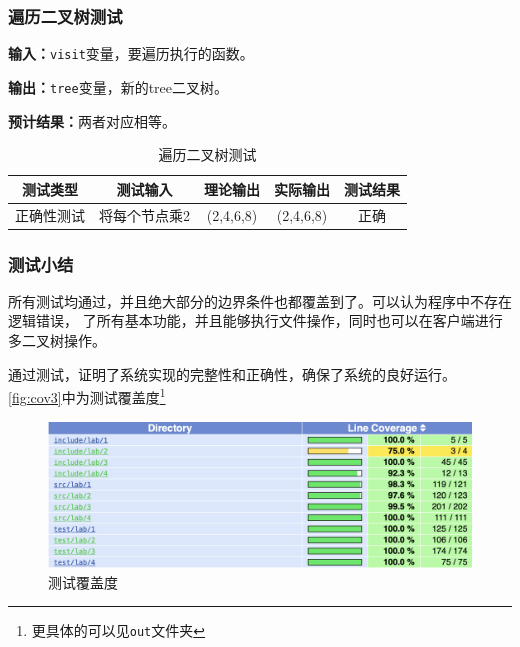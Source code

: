 \subsubsection{遍历二叉树测试}
\textbf{输入：}\texttt{visit}变量，要遍历执行的函数。
\par
\textbf{输出：}\texttt{tree}变量，新的tree二叉树。
\par
\textbf{预计结果：}两者对应相等。
\begin{table}[Htb]
    \caption{遍历二叉树测试}
    \centering
    \begin{tabular}{@{}ccccc@{}}
        \toprule
        \multicolumn{1}{c}{测试类型}    & \multicolumn{1}{c}{测试输入} & \multicolumn{1}{c}{理论输出} & \multicolumn{1}{c}{实际输出} &
        \multicolumn{1}{c}{测试结果} \\ \midrule
        \multicolumn{1}{c|}{正确性测试}  & 将每个节点乘2&(2,4,6,8)&(2,4,6,8)&正确\\ \bottomrule
    \end{tabular}
    \label{tab:traversetest3}
\end{table}

\subsubsection{测试小结}
所有测试均通过，并且绝大部分的边界条件也都覆盖到了。可以认为程序中不存在逻辑错误，
了所有基本功能，并且能够执行文件操作，同时也可以在客户端进行多二叉树操作。
\par
通过测试，证明了系统实现的完整性和正确性，确保了系统的良好运行。
\autoref{fig:cov3}中为测试覆盖度\footnote{更具体的可以见\texttt{out}文件夹}

\begin{figure}
\centering
\caption{测试覆盖度}\label{fig:cov3}
\includegraphics[scale=.5]{cov.png}
\end{figure}

